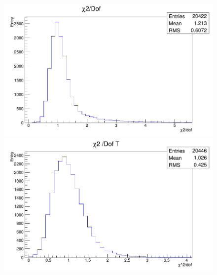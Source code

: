 \begin{figure}[H]    
\begin{minipage}[t]{0.4\textwidth}
\includegraphics[width=\linewidth]{rozdzial6/KsLL_chi2.png}
\end{minipage}
\hspace{\fill}
\begin{minipage}[t]{0.4\textwidth}
\includegraphics[width=\linewidth]{rozdzial6/KsLL_chi2T.png}
\end{minipage}


\end{figure}
